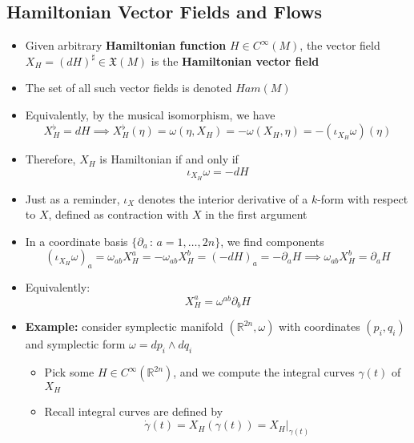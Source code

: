 \documentclass[12pt,a4paper]{article}
\numberwithin{equation}{section}
\begin{document}
	\subsection{Hamiltonian Vector Fields and Flows}
	\begin{itemize}
		\item Given arbitrary \textbf{Hamiltonian function} $H\in C^{\infty}(M)$, the vector field $X_{H}=(dH)^{\sharp}\in\mathfrak{X}(M)$ is the \textbf{Hamiltonian vector field}
		\item The set of all such vector fields is denoted $Ham(M)$
		\item Equivalently, by the musical isomorphism, we have
		\begin{equation}
			X_{H}^{\flat}=dH\implies X_{H}^{\flat}(\eta)=\omega(\eta,X_{H})=-\omega(X_{H},\eta)=-(\iota_{X_{H}}\omega)(\eta)
		\end{equation}
		\item Therefore, $X_{{H}}$ is Hamiltonian if and only if
		\begin{equation}
			\iota_{X_{H}}\omega=-dH
		\end{equation}
		\item Just as a reminder, $\iota_{X}$ denotes the interior derivative of a $k$-form with respect to $X$, defined as contraction with $X$ in the first argument
		\item In a coordinate basis $\{\partial_{a}\,:\,a=1,\ldots,2n\}$, we find components
		\begin{equation}
			(\iota_{X_{H}}\omega)_{a}=\omega_{ab}X_{H}^{a}=-\omega_{ab}X_{H}^{b}=(-dH)_{a}=-\partial_{a}H\implies \omega_{ab}X_{H}^{b}=\partial_{a}H
		\end{equation}
		\item Equivalently:
		\begin{equation}
			X_{H}^{a}=\omega^{ab}\partial_{b}H
		\end{equation}
		\item \textbf{Example:} consider symplectic manifold $(\mathbb{R}^{2n},\omega)$ with coordinates $(p_{i},q_{i})$ and symplectic form $\omega=dp_{i}\wedge dq_{i}$
		\begin{itemize}
			\item Pick some $H\in C^{\infty}(\mathbb{R}^{2n})$, and we compute the integral curves $\gamma(t)$ of $X_{H}$
			\item Recall integral curves are defined by
			\begin{equation}
				\dot{\gamma}(t)=X_{H}(\gamma(t))=X_{H}\vert_{\gamma(t)}
			\end{equation}

\end{itemize}
\end{itemize}
\end{document}
